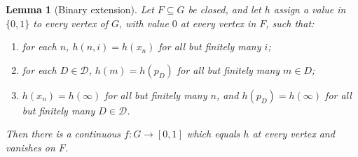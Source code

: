 \documentclass[11pt]{amsart}
\newtheorem{lemma}[theorem]{Lemma}
\theoremstyle{definition}
\theoremstyle{remark}
\newcommand{\cD}{\mathcal{D}}
\numberwithin{equation}{section}
\begin{document}
\begin{lemma}[Binary extension]\label{lem:binary}
Let $F\subseteq G$ be closed, and let $h$ assign a value in $\{0,1\}$ to every vertex of $G$, with value $0$ at every vertex in $F$, such that:
\begin{enumerate}[label=\textup{(\roman*)}]
\item for each $n$, $h(n,i)=h(x_n)$ for all but finitely many $i$;
\item for each $D\in\cD$, $h(m)=h(p_D)$ for all but finitely many $m\in D$;
\item $h(x_n)=h(\infty)$ for all but finitely many $n$, and $h(p_D)=h(\infty)$ for all but finitely many $D\in\cD$.
\end{enumerate}
Then there is a continuous $f\colon G\to[0,1]$ which equals $h$ at every vertex and vanishes on $F$.
\end{lemma}
\end{document}
